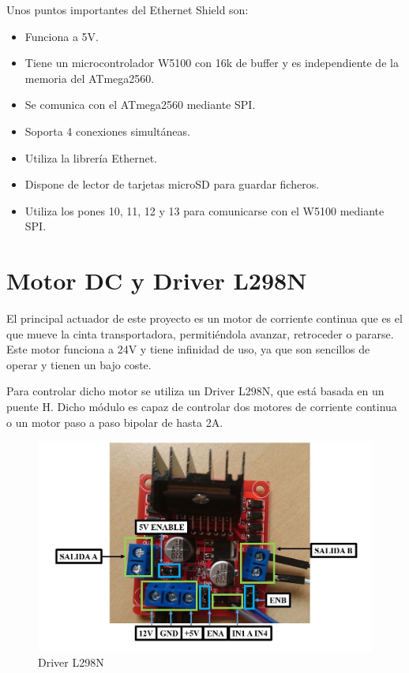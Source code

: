 Unos puntos importantes del Ethernet Shield son:
\begin{itemize}
    \item Funciona a 5V.
    \item Tiene un microcontrolador W5100 con 16k de buffer y 
    es independiente de la memoria del ATmega2560.
    \item Se comunica con el ATmega2560 mediante SPI.
    \item Soporta 4 conexiones simultáneas.
    \item Utiliza la librería Ethernet.
    \item Dispone de lector de tarjetas microSD para guardar ficheros.
    \item Utiliza los pones 10, 11, 12 y 13 para comunicarse con el
    W5100 mediante SPI.
\end{itemize}

\section{Motor DC y Driver L298N}

El principal actuador de este proyecto es un motor de corriente
continua que es el que mueve la cinta transportadora, permitiéndola
avanzar, retroceder o pararse. Este motor funciona a 24V y tiene 
infinidad de uso, ya que son sencillos de operar y tienen un bajo coste.

Para controlar dicho motor se utiliza un Driver L298N, que está basada
en un puente H. Dicho módulo es capaz de controlar dos motores de 
corriente continua o un motor paso a paso bipolar de hasta 2A.

\begin{figure}[hbtp]
	\centering
	\includegraphics[scale=0.25]{02-hardware/03-l298n.png}
	\caption{Driver L298N}
	\label{fig:figura23}
	\end{figure}


